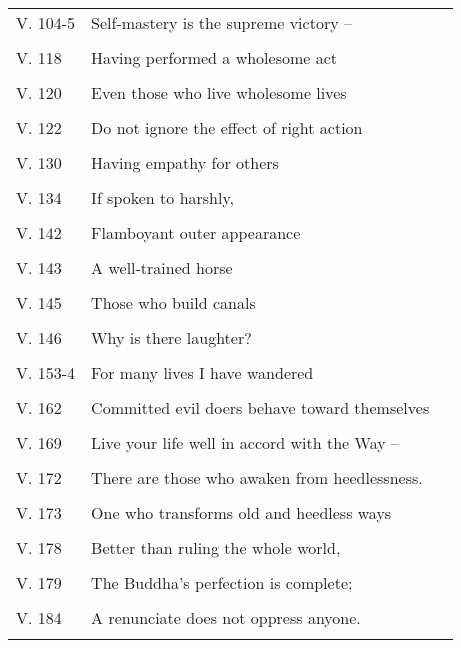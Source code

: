 {\begin{longtable}[c]{llr}
V. 104-5 & Self-mastery is the supreme victory --\\ & \pageref{dhp-104}\\
V. 118 & Having performed a wholesome act\\ & \pageref{dhp-118}\\
V. 120 & Even those who live wholesome lives\\ & \pageref{dhp-120}\\
V. 122 & Do not ignore the effect of right action\\ & \pageref{dhp-122}\\
V. 130 & Having empathy for others\\ & \pageref{dhp-130}\\
V. 134 & If spoken to harshly,\\ & \pageref{dhp-134}\\
V. 142 & Flamboyant outer appearance\\ & \pageref{dhp-142}\\
V. 143 & A well-trained horse\\ & \pageref{dhp-143}\\
V. 145 & Those who build canals\\ & \pageref{dhp-145}\\
V. 146 & Why is there laughter?\\ & \pageref{dhp-146}\\
V. 153-4 & For many lives I have wandered\\ & \pageref{dhp-153}\\
V. 162 & Committed evil doers behave toward themselves\\ & \pageref{dhp-162}\\
V. 169 & Live your life well in accord with the Way --\\ & \pageref{dhp-169}\\
V. 172 & There are those who awaken from heedlessness.\\ & \pageref{dhp-172}\\
V. 173 & One who transforms old and heedless ways\\ & \pageref{dhp-173}\\
V. 178 & Better than ruling the whole world,\\ & \pageref{dhp-178}\\
V. 179 & The Buddha's perfection is complete;\\ & \pageref{dhp-179}\\
V. 184 & A renunciate does not oppress anyone.\\ & \pageref{dhp-184}\\

\end{longtable}}
